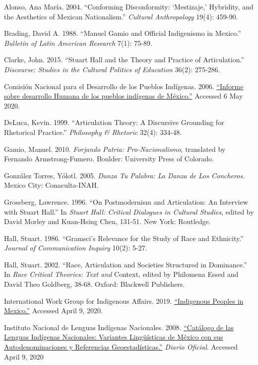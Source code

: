 \documentclass[twoside]{article}
\begin{document}
\begin{hangparas}{15pt}{1}
 Alonso, Ana María. 2004. ``Conforming Disconformity:
`Mestizaje,' Hybridity, and the Aesthetics of Mexican Nationalism.''
\emph{Cultural Anthropology} 19(4): 459-90.

 Brading, David A. 1988. ``Manuel Gamio and Official
Indigenismo in Mexico.'' \emph{Bulletin of Latin American Research}
7(1): 75-89.

 Clarke, John. 2015. ``Stuart Hall and the Theory and Practice
of Articulation.'' \emph{Discourse: Studies in the Cultural Politics of
Education} 36(2): 275-286.

 Comisión Nacional para el Desarrollo de los Pueblos
Indígenas. 2006.
\href{http://www.cdi.gob.mx/idh/informe_desarrollo_humano_pueblos_indigenas_mexico_2006.pdf}{``Informe
sobre desarrollo Humana de los pueblos indígenas de México.''} Accessed
6 May 2020.

 DeLuca, Kevin. 1999. ``Articulation Theory: A Discursive
Grounding for Rhetorical Practice.'' \emph{Philosophy \& Rhetoric}
32(4): 334-48.

 Gamio, Manuel. 2010. \emph{Forjando Patria:
Pro-Nacionalismo}, translated by Fernando Armstrong-Fumero. Boulder:
University Press of Colorado.

 González Torres, Yólotl. 2005. \emph{Danza Tu Palabra: La
Danza de Los Concheros}. Mexico City: Conaculta-INAH.

 Grossberg, Lawrence. 1996. ``On Postmodernism and
Articulation: An Interview with Stuart Hall.'' In \emph{Stuart Hall:
Critical Dialogues in Cultural Studies}, edited by David Morley and
Kuan-Hsing Chen, 131-51. New York: Routledge.

 Hall, Stuart. 1986. ``Gramsci's Relevance for the Study of
Race and Ethnicity.'' \emph{Journal of Communication Inquiry} 10(2):
5-27.

 Hall, Stuart. 2002. ``Race, Articulation and Societies
Structured in Dominance.'' In \emph{Race Critical Theories: Text and}
Context, edited by Philomena Essed and David Theo Goldberg, 38-68.
Oxford: Blackwell Publishers.

 International Work Group for Indigenous Affairs. 2019.
\href{https://www.iwgia.org/en/mexico.html}{``Indigenous Peoples in
Mexico.''} Accessed April 9, 2020.

 Instituto Nacional de Lenguas Indígenas Nacionales. 2008.
\href{https://www.inali.gob.mx/pdf/CLIN_completo.pdf}{``Catálogo de las
Lenguas Indígenas Nacionales: Variantes Lingüísticas de México con sus
Autodenominaciones y Referencias Geoestadísticas.''} \emph{Diario
Oficial}. Accessed April 9, 2020


\end{hangparas}
\end{document}
